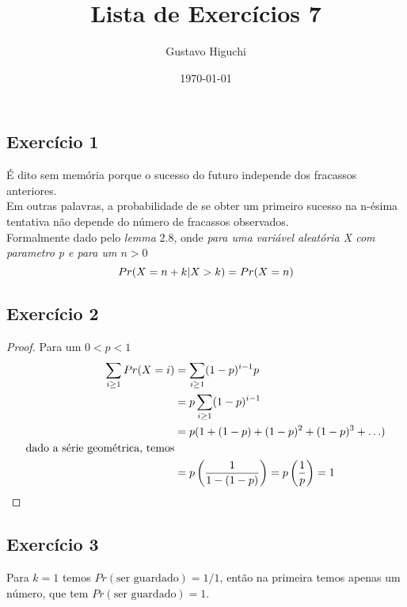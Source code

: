 \documentclass{article}
\title{Lista de Exercícios 7}
\author{Gustavo Higuchi}
\date{\today}
\begin{document}
\maketitle

\tableofcontents
\newpage


\chapter{}
\section{Exercício 1}
\hspace*{15pt}É dito sem memória porque o sucesso do futuro independe dos fracassos anteriores.\\

Em outras palavras, a probabilidade de se obter um primeiro sucesso na n-ésima tentativa
não depende do número de fracassos observados.\\

Formalmente dado pelo \textit{lemma} 2.8, onde \textit{para uma variável aleatória X com parametro p
e para um $n > 0$} 
\begin{equation}
    \notag
    Pr(X = n + k | X > k) = Pr(X = n)
\end{equation}


\section{Exercício 2}
\begin{proof}
    Para um $0 < p < 1$
    \begin{equation}
    \notag
        \begin{split}
        \sum\limits_{i\geq1}Pr(X = i) &= \sum\limits_{i\geq1}(1-p)^{i-1}p\\
        &= p\sum\limits_{i\geq1}(1-p)^{i-1}\\
        &= p(1 + (1-p) + (1-p)^2 + (1-p)^3 + \ldots)\\
        \text{dado a série geométrica, temos}&\\
        &= p\left(\dfrac{1}{1-(1-p)}\right) = p\left(\dfrac{1}{p}\right) = 1
        \end{split}
    \end{equation}
\end{proof}

\section{Exercício 3}
\hspace*{15pt}Para $k=1$ temos $Pr(\text{ser guardado}) = 1/1 $, então na primeira
temos apenas um número, que tem $Pr(\text{ser guardado}) = 1$. \\
\end{document}
